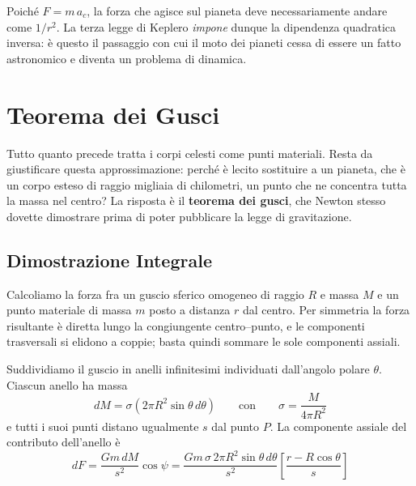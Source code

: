 Poiché $F = m \, a_c$, la forza che agisce sul pianeta deve necessariamente andare come $1/r^2$. La terza legge di Keplero \emph{impone} dunque la dipendenza quadratica inversa: è questo il passaggio con cui il moto dei pianeti cessa di essere un fatto astronomico e diventa un problema di dinamica.

\section{Teorema dei Gusci}

Tutto quanto precede tratta i corpi celesti come punti materiali. Resta da giustificare questa approssimazione: perché è lecito sostituire a un pianeta, che è un corpo esteso di raggio migliaia di chilometri, un punto che ne concentra tutta la massa nel centro? La risposta è il \textbf{teorema dei gusci}, che Newton stesso dovette dimostrare prima di poter pubblicare la legge di gravitazione.

\subsection{Dimostrazione Integrale}

Calcoliamo la forza fra un guscio sferico omogeneo di raggio $R$ e massa $M$ e un punto materiale di massa $m$ posto a distanza $r$ dal centro. Per simmetria la forza risultante è diretta lungo la congiungente centro--punto, e le componenti trasversali si elidono a coppie; basta quindi sommare le sole componenti assiali.

Suddividiamo il guscio in anelli infinitesimi individuati dall'angolo polare $\theta$. Ciascun anello ha massa
\begin{equation}
    dM = \sigma \left(2\pi R^2 \sin\theta \, d\theta\right)
    \qquad \text{con} \qquad \sigma = \frac{M}{4\pi R^2}
\end{equation}
e tutti i suoi punti distano ugualmente $s$ dal punto $P$. La componente assiale del contributo dell'anello è
\begin{equation}
    dF = \frac{G m \, dM}{s^2} \cos\psi
       = \frac{G m \, \sigma \, 2\pi R^2 \sin\theta \, d\theta}{s^2}
         \left[ \frac{r - R\cos\theta}{s} \right]
\end{equation}


